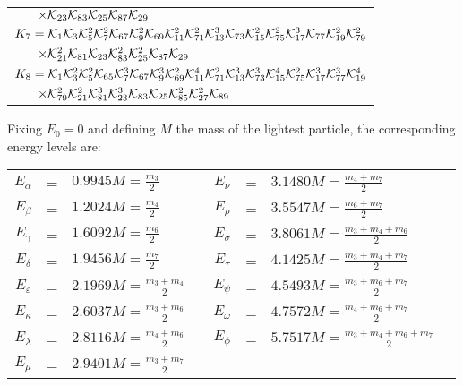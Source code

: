 \documentclass[a4paper,12pt]{report}
\begin{document}
\begin{center}
\begin{tabular}{l}
                      $ \quad \;\;\; \times{\cal K}_{23}{\cal K}_{83}{\cal K}_{25}{\cal K}_{87}{\cal K}_{29}$ \\
$K_{7}={\cal K}_{1}{\cal K}_{3}{\cal K}_{5}^{2}{\cal K}_{7}^{2}{\cal K}_{67}{\cal K}_{9}^{2}{\cal K}_{69}
                     {\cal K}_{11}^{2}
                     {\cal K}_{71}^{2} {\cal K}_{13}^{3}{\cal K}_{73}{\cal K}_{15}^{2}{\cal K}_{75}^{2}{\cal K}_{17}^{3}
                     {\cal K}_{77}
                     {\cal K}_{19}^{2}{\cal K}_{79}^{2}$\\

                     $ \quad \;\;\; \times {\cal K}_{21}^{2}{\cal K}_{81}{\cal K}_{23}{\cal K}_{83}^{2}
                     {\cal K}_{25}^{2}{\cal K}_{87}
                     {\cal K}_{29}$ \\
$K_{8}={\cal K}_{1}{\cal K}_{3}^{2}{\cal K}_{5}^{2}{\cal K}_{65}{\cal K}_{7}^{3}{\cal K}_{67}{\cal
K}_{9}^{3}{\cal K}_{69}^{2}{\cal K}_{11}^{4}
                     {\cal K}_{71}^{2} {\cal K}_{13}^{3}{\cal K}_{73}^{3}{\cal K}_{15}^{4}{\cal K}_{75}^{2}{\cal K}_{17}^{3}
                     {\cal K}_{77}^{3}
                     {\cal K}_{19}^{4}$\\

                     $ \quad \;\;\; \times {\cal K}_{79}^{2}{\cal K}_{21}^{2}{\cal K}_{81}^{3}{\cal K}_{23}^{3}{\cal K}_{83}
                     {\cal K}_{25}{\cal K}_{85}^{2}{\cal K}_{27}^{2}{\cal K}_{89}$ \\
\end{tabular}
\end{center}

\vspace{1cm}

Fixing $E_{0}=0$ and defining $M$ the mass of the lightest particle, the corresponding energy levels are:

\begin{center}
\begin{tabular}{cclc|cclc}
$E_{\alpha}$ &=& $0.9945 M =\frac{m_{3}}{2}$ && $E_{\nu}$ &=& $3.1480 M =\frac{m_{4}+m_{7}}{2}$ \\
$E_{\beta}$ &=& $1.2024 M =\frac{m_{4}}{2}$ && $E_{\rho}$ &=& $3.5547 M =\frac{m_{6}+m_{7}}{2}$ \\
$E_{\gamma}$ &=& $1.6092 M =\frac{m_{6}}{2}$ && $E_{\sigma}$ &=& $3.8061 M =\frac{m_{3}+m_{4}+m_{6}}{2}$ \\
$E_{\delta}$ &=& $1.9456 M =\frac{m_{7}}{2}$ && $E_{\tau}$ &=& $4.1425 M =\frac{m_{3}+m_{4}+m_{7}}{2}$ \\
$E_{\varepsilon}$ &=& $2.1969 M =\frac{m_{3}+m_{4}}{2}$ && $E_{\psi}$ &=& $4.5493 M =\frac{m_{3}+m_{6}+m_{7}}{2}$ \\
$E_{\kappa}$ &=& $2.6037 M =\frac{m_{3}+m_{6}}{2}$ && $E_{\omega}$ &=& $4.7572 M =\frac{m_{4}+m_{6}+m_{7}}{2}$ \\
$E_{\lambda}$ &=& $2.8116 M =\frac{m_{4}+m_{6}}{2}$ && $E_{\phi}$ &=& $5.7517 M =\frac{m_{3}+m_{4}+m_{6}+m_{7}}{2}$ \\
$E_{\mu}$ &=& $2.9401 M =\frac{m_{3}+m_{7}}{2}$ && \\
\end{tabular}
\end{center}
\end{document}
